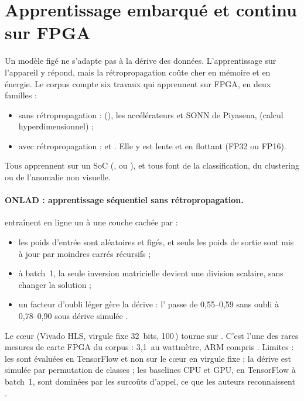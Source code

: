 \section{Apprentissage embarqué et continu sur FPGA}
\label{sec:cl-fpga}

Un modèle figé ne s'adapte pas à la dérive des données. L'apprentissage sur l'appareil y
répond, mais la rétropropagation coûte cher en mémoire et en énergie. Le corpus compte six
travaux qui apprennent sur FPGA, en deux familles :
\begin{itemize}
  \item sans rétropropagation :  (), les accélérateurs  et SONN de Piyasena,
     (calcul hyperdimensionnel) ;
  \item avec rétropropagation :  et . Elle y est lente et en flottant
    (FP32 ou FP16).
\end{itemize}
Tous apprennent sur un SoC  (,  ou ), et tous font de la
classification, du clustering ou de l'anomalie non visuelle.

\paragraph{ONLAD : apprentissage séquentiel sans rétropropagation.}
\citet{2019-tsukada-neural-network-device-learning-anomaly} entraînent en ligne un  à une
couche cachée par  :
\begin{itemize}
  \item les poids d'entrée sont aléatoires et figés, et seuls les poids de sortie sont mis
    à jour par moindres carrés récursifs  ;
  \item à batch~1, la seule inversion matricielle devient une division scalaire, sans
    changer la solution  ;
  \item un facteur d'oubli léger gère la dérive : l' passe de 0,55--0,59 sans oubli à
    0,78--0,90 sous dérive simulée .
\end{itemize}
Le cœur (Vivado HLS, virgule fixe 32~bits, 100\,) tourne sur . C'est l'une des
rares mesures de carte FPGA du corpus : 3,1\, au wattmètre, ARM compris .
Limites : les  sont évaluées en TensorFlow et non sur le cœur en virgule fixe
 ; la dérive est simulée par permutation de classes ; les baselines CPU et GPU,
en TensorFlow à batch~1, sont dominées par les surcoûts d'appel, ce que les auteurs
reconnaissent .

